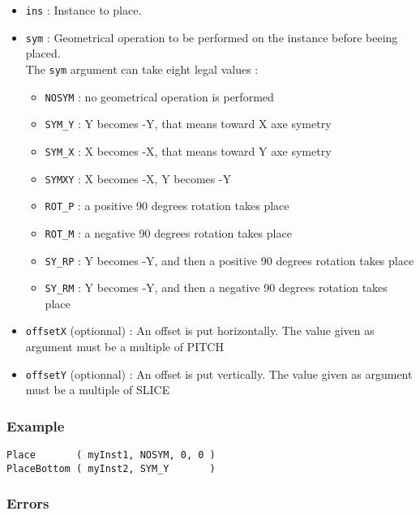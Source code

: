 \begin{itemize}
    \item \verb-ins- : Instance to place.
    \item \verb-sym- : Geometrical operation to be performed on the instance before beeing placed.\\The \verb-sym- argument can take eight legal values :
    \begin{itemize}
        \item \verb-NOSYM- : no geometrical operation is performed
        \item \verb-SYM_Y- : Y becomes -Y, that means toward X axe symetry
        \item \verb-SYM_X- : X becomes -X, that means toward Y axe symetry
        \item \verb-SYMXY- : X becomes -X, Y becomes -Y
        \item \verb-ROT_P- : a positive 90 degrees rotation takes place
        \item \verb-ROT_M- : a negative 90 degrees rotation takes place
        \item \verb-SY_RP- : Y becomes -Y, and then a positive 90 degrees rotation takes place
        \item \verb-SY_RM- : Y becomes -Y, and then a negative 90 degrees rotation takes place
    \end{itemize}
    \item \verb-offsetX- (optionnal) : An offset is put horizontally. The value given as argument must be a multiple of PITCH
    \item \verb-offsetY- (optionnal) : An offset is put vertically. The value given as argument must be a multiple of SLICE
\end{itemize}

\subsubsection{Example}

\begin{verbatim}
Place       ( myInst1, NOSYM, 0, 0 )
PlaceBottom ( myInst2, SYM_Y       )
\end{verbatim}

\subsubsection{Errors}
    
